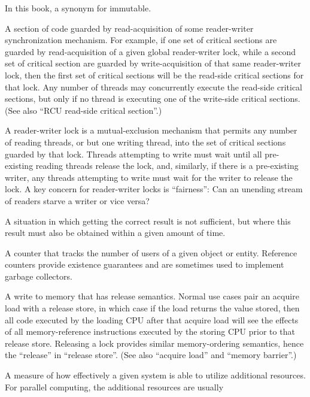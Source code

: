 \begin{description}
	In this book, a synonym for immutable.
\item[\IXGh{Read-Side}{Critical Section}:]
	A section of code guarded by read-acquisition of
	some reader-writer synchronization mechanism.
	For example, if one set of critical sections are guarded by
	read-acquisition of
	a given global reader-writer lock, while a second set of critical
	section are guarded by write-acquisition of that same reader-writer
	lock, then the first set of critical sections will be the
	read-side critical sections for that lock.
	Any number of threads may concurrently execute the read-side
	critical sections, but only if no thread is executing one of
	the write-side critical sections.
	(See also ``RCU read-side critical section''.)
\item[\IXGh{Reader-Writer}{Lock}:]
	A reader-writer lock is a mutual-exclusion mechanism that
	permits any number of reading
	threads, or but one writing thread, into the set of critical
	sections guarded by that lock.
	Threads attempting to write must wait until all pre-existing
	reading threads release the lock, and, similarly, if there
	is a pre-existing writer, any threads attempting to write must
	wait for the writer to release the lock.
	A key concern for reader-writer locks is ``fairness'':
	Can an unending stream of readers starve a writer or vice versa?
\item[\IXG{Real Time}:]
	A situation in which getting the correct result is not sufficient,
	but where this result must also be obtained within a given amount
	of time.
\item[\IXG{Reference Count}:]
	A counter that tracks the number of users of a given object or
	entity.
	Reference counters provide existence guarantees and are sometimes
	used to implement garbage collectors.
\item[\IXG{Release Store}:]
	A write to memory that has release semantics.
	Normal use cases pair an acquire load with a release store,
	in which case if the load returns the value stored, then all
	code executed by the loading CPU after that acquire load will
	see the effects of all memory-reference instructions executed
	by the storing CPU prior to that release store.
	Releasing a lock provides similar memory-ordering semantics,
	hence the ``release'' in ``release store''.
	(See also ``acquire load'' and ``memory barrier''.)
\item[\IXG{Scalability}:]
	A measure of how effectively a given system is able to utilize
	additional resources.
	For parallel computing, the additional resources are usually

\end{description}
